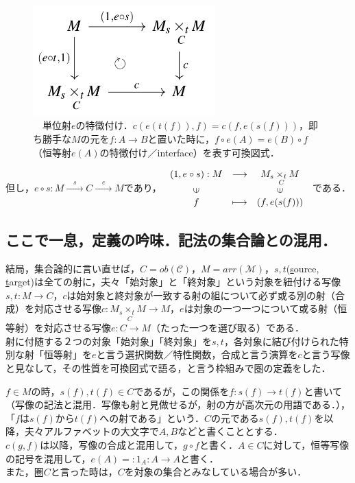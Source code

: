 \documentclass[uplatex, 12pt, a4paper, dvipdfmx]{jsarticle}
\begin{document}
\begin{figure}[ht] \begin{center}  \caption{\label{def-cd:4}　単位射$e$の特徴付け．$c(e(t(f)),f)=c(f,e(s(f)))$，即ち勝手な$M$の元を$f:A\longrightarrow B$と置いた時に，$f\circ e(A)=e(B)\circ f$（恒等射$e(A)$の特徴付け／interface）を表す可換図式．}
    \includegraphics[width=7cm]{cd-4.png}
\end{center}\end{figure}
但し，$e\circ s:M\xrightarrow{\quad s\quad}C\xrightarrow{\quad e \quad}M$であり，
$\begin{array}{ccc}
    (1,e\circ s):M & \longrightarrow & M_s \underset{C}{\times_t}M\\
    \rotatebox{90}{$\in$} & & \rotatebox{90}{$\in$}\\
    f & \longmapsto & (f,e(s(f)))
\end{array}$
である．

\subsection{ここで一息，定義の吟味．記法の集合論との混用．}

結局，集合論的に言い直せば，$C=ob(\mathcal{C})$，$M=arr(\mathcal{M})$，$s,t$(\underline{s}ource, \underline{t}arget)は全ての射に，夫々「始対象」と「終対象」という対象を紐付ける写像$s,t:M\longrightarrow C$，$c$は始対象と終対象が一致する射の組について必ず或る別の射（合成）を対応させる写像$c:M_s \underset{C}{\times_t}M \longrightarrow M$，$e$は対象の一つ一つについて或る射（恒等射）を対応させる写像$e:C\longrightarrow M$（たった一つを選び取る）である．\\
射に付随する２つの対象「始対象」「終対象」を$s,t$，各対象に結び付けられた特別な射「恒等射」を$e$と言う選択関数／特性関数，合成と言う演算を$c$と言う写像と見なして，その性質を可換図式で語る，と言う枠組みで圏の定義をした．

$f\in M$の時，$s(f), t(f)\in C$であるが，この関係を$f:s(f)\longrightarrow t(f)$と書いて（写像の記法と混用．写像も射と見做せるが，射の方が高次元の用語である．），「$f$は$s(f)$から$t(f)$への射である」という．$C$の元である$s(f),t(f)$を以降，夫々アルファベットの大文字で$A,B$などと書くこととする．\\
$c(g,f)$は以降，写像の合成と混用して，$g\circ f$と書く．$A\in C$に対して，恒等写像の記号を混用して，$e(A)=:1_A : A\longrightarrow A$と書く．\\
また，圏$C$と言った時は，$C$を対象の集合とみなしている場合が多い．
\end{document}
